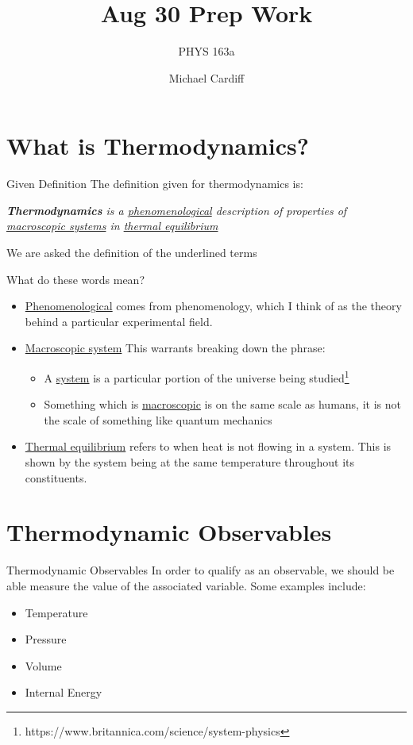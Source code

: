 \documentclass{beamer}
\title{Aug 30 Prep Work}
\author{Michael Cardiff}
\subtitle{PHYS 163a}
\begin{document}
\begin{frame}
  \titlepage
\end{frame}

\section{What is Thermodynamics?}
\begin{frame}{Given Definition}
  The definition given for thermodynamics is:
  \begin{center}
    \textit{\textbf{Thermodynamics} is a \underline{phenomenological} description of properties of \underline{macroscopic systems} in \underline{thermal equilibrium}}
  \end{center}
  We are asked the definition of the underlined terms
\end{frame}

\begin{frame}{What do these words mean?}
  \begin{itemize}
  \item \underline{Phenomenological} comes from phenomenology, which I think of as the theory behind a particular experimental field. 
  \item \underline{Macroscopic system} This warrants breaking down the phrase:
    \begin{itemize}
    \item A \underline{system} is a particular portion of the universe being studied\footnote{https://www.britannica.com/science/system-physics}
    \item Something which is \underline{macroscopic} is on the same scale as humans, it is not the scale of something like quantum mechanics
    \end{itemize}
  \item \underline{Thermal equilibrium} refers to when heat is not flowing in a system. This is shown by the system being at the same temperature throughout its constituents. 
  \end{itemize}
\end{frame}

\section{Thermodynamic Observables}
\begin{frame}{Thermodynamic Observables}
  In order to qualify as an observable, we should be able measure the value of the associated variable. Some examples include:
  \begin{itemize}
  \item Temperature
  \item Pressure
  \item Volume
  \item Internal Energy
  \end{itemize}
\end{frame}
\end{document}
